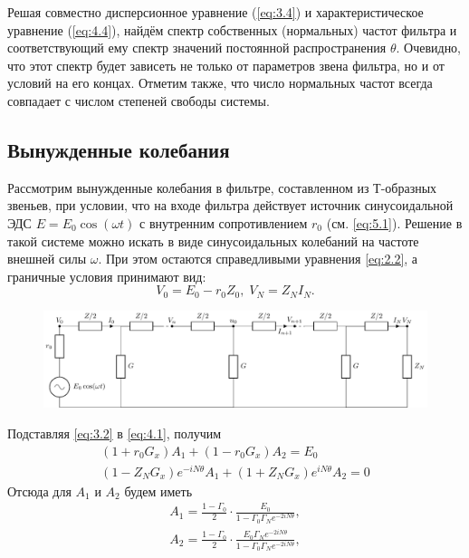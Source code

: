 Решая совместно дисперсионное уравнение (\ref{eq:3.4}) и характеристическое уравнение (\ref{eq:4.4}), найдём спектр собственных (нормальных) частот фильтра и соответствующий ему спектр значений постоянной распространения $\theta$. Очевидно, что этот спектр будет зависеть не только от параметров звена фильтра, но и от условий на его концах. Отметим также, что число нормальных частот всегда совпадает с числом степеней свободы системы.


\subsection{Вынужденные колебания}
Рассмотрим вынужденные колебания в фильтре, составленном из Т-образных звеньев, при условии, что на входе фильтра действует источник синусоидальной ЭДС $E=E_0\cos(\omega t)$ с внутренним сопротивлением $r_0$ (см. \ref{eq:5.1}). Решение в такой системе можно искать в виде синусоидальных колебаний на частоте внешней силы $\omega$. При этом остаются справедливыми уравнения \eqref{eq:2.2}, а граничные условия принимают вид:
\begin{equation}
	\label{eq:5.1}
	V_0=E_0-r_0Z_0,\;V_N=Z_NI_N.
\end{equation}
\begin{figure}[h!]
	\centering
	\includegraphics[]{chem/picture3}
	\caption{}
	\label{fig:3}
\end{figure}
Подставляя \eqref{eq:3.2} в \eqref{eq:4.1}, получим 
\begin{equation}
	\label{eq:4.2}
	\begin{gathered}
	(1+r_0G_x)A_1+(1-r_0G_x)A_2=E_0\\
	(1-Z_NG_x)e^{-iN\theta}A_1+(1+Z_NG_x)e^{iN\theta}A_2=0
	\end{gathered}
\end{equation}
Отсюда для $A_1$ и $A_2$ будем иметь
\begin{equation}
	\label{eq:4.3}
	\begin{gathered}
	A_1=\frac{1-\Gamma_0}{2}\cdot\frac{E_0}{1-\Gamma_0\Gamma_Ne^{-2iN\theta}},\\
	A_2=\frac{1-\Gamma_0}{2}\cdot\frac{E_0\Gamma_Ne^{-2iN\theta}}{1-\Gamma_0\Gamma_Ne^{-2iN\theta}},\\
	\end{gathered}
\end{equation}
